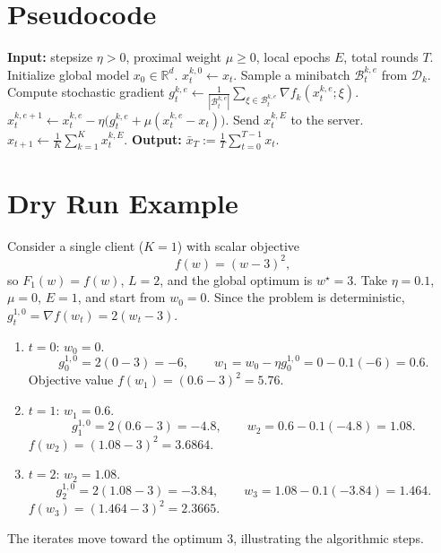 \documentclass{article}
\begin{document}
\section*{Pseudocode}
\begin{algorithm}[H]
\caption{FedProx Local SGD}
\begin{algorithmic}[1]
\State \textbf{Input:} stepsize $\eta>0$, proximal weight $\mu\ge0$, local epochs $E$, total rounds $T$.
\State Initialize global model $x_0\in\mathbb{R}^d$.
        \State $x_{t}^{k,0}\gets x_t$.
            \State Sample a minibatch $\mathcal{B}_{t}^{k,e}$ from $\mathcal{D}_k$.
            \State Compute stochastic gradient 
            $g_{t}^{k,e}\gets \frac{1}{|\mathcal{B}_{t}^{k,e}|}
            \sum_{\xi\in\mathcal{B}_{t}^{k,e}}\nabla f_k(x_{t}^{k,e};\xi)$.
            \State $x_{t}^{k,e+1}\gets x_{t}^{k,e}
            -\eta\big(g_{t}^{k,e}+ \mu(x_{t}^{k,e}-x_t)\big)$.
        \EndFor
        \State Send $x_{t}^{k,E}$ to the server.
    \EndFor
    \State $x_{t+1}\gets \frac1K\sum_{k=1}^K x_{t}^{k,E}$.
\EndFor
\State \textbf{Output:} $\displaystyle \bar x_T:=\frac1T\sum_{t=0}^{T-1}x_t$.
\end{algorithmic}
\end{algorithm}

\section*{Dry Run Example}
Consider a single client ($K=1$) with scalar objective
\[
f(w)=(w-3)^2,
\]
so $F_1(w)=f(w)$, $L=2$, and the global optimum is $w^\star=3$.
Take $\eta=0.1$, $\mu=0$, $E=1$, and start from $w_0=0$.
Since the problem is deterministic, $g_t^{1,0}=\nabla f(w_t)=2(w_t-3)$.

\begin{enumerate}[label=\textbf{Iter \arabic*:},leftmargin=*]
\item $t=0$: $w_0=0$.
    \[
    g_0^{1,0}=2(0-3)=-6,\qquad
    w_1 = w_0 -\eta g_0^{1,0}=0-0.1(-6)=0.6.
    \]
    Objective value $f(w_1)=(0.6-3)^2=5.76$.
\item $t=1$: $w_1=0.6$.
    \[
    g_1^{1,0}=2(0.6-3)=-4.8,\qquad
    w_2 =0.6-0.1(-4.8)=1.08.
    \]
    $f(w_2)=(1.08-3)^2=3.6864$.
\item $t=2$: $w_2=1.08$.
    \[
    g_2^{1,0}=2(1.08-3)=-3.84,\qquad
    w_3 =1.08-0.1(-3.84)=1.464.
    \]
    $f(w_3)=(1.464-3)^2=2.3665$.
\end{enumerate}
The iterates move toward the optimum $3$, illustrating the
algorithmic steps.
\end{document}
